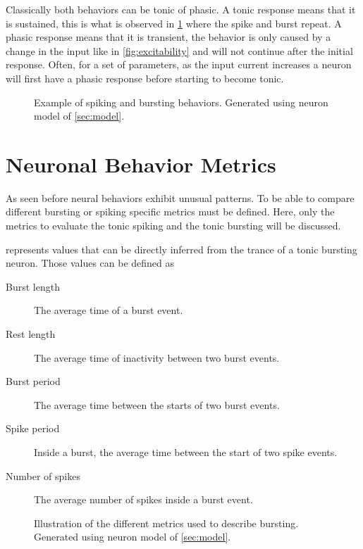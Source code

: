 Classically both behaviors can be tonic of phasic.
A tonic response means that it is sustained, this is what is observed in \cref{fig:behaviours} where the spike and burst repeat.
A phasic response means that it is transient, the behavior is only caused by a change in the input like in \cref{fig:excitability} and will not continue after the initial response.
Often, for a set of parameters, as the input current increases a neuron will first have a phasic response before starting to become tonic.

\begin{figure}[htb]
    \centering
    \caption{Example of spiking and bursting behaviors. Generated using neuron model of \cref{sec:model}.}
    \label{fig:behaviours}
\end{figure}

\section{Neuronal Behavior Metrics}

As seen before neural behaviors exhibit unusual patterns. 
To be able to compare different bursting or spiking specific metrics must be defined.
Here, only the metrics to evaluate the tonic spiking and the tonic bursting will be discussed.

 represents values that can be directly inferred from the trance of a tonic bursting neuron. Those values can be defined as
\begin{description}
    \item[Burst length] The average time of a burst event.
    \item[Rest length] The average time of inactivity between two burst events.
    \item[Burst period] The average time between the starts of two burst events.
    \item[Spike period] Inside a burst, the average time between the start of two spike events.
    \item[Number of spikes] The average number of spikes inside a burst event.
\end{description}

\begin{figure}[htb]
    \centering
    \caption{Illustration of the different metrics used to describe bursting. Generated using neuron model of \cref{sec:model}.}
    \label{fig:burst_metrics}
\end{figure}

